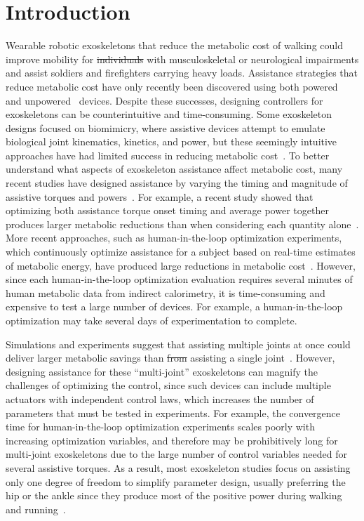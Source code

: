 \documentclass[10pt,letterpaper]{article}
\providecommand{\DIFaddtex}[1]{{\protect\color{blue}\uwave{#1}}} %
\providecommand{\DIFdeltex}[1]{{\protect\color{red}\sout{#1}}}                      %
\providecommand{\DIFaddbegin}{} %
\providecommand{\DIFaddend}{} %
\providecommand{\DIFdelbegin}{} %
\providecommand{\DIFdelend}{} %
\providecommand{\DIFadd}[1]{\texorpdfstring{\DIFaddtex{#1}}{#1}} %
\providecommand{\DIFdel}[1]{\texorpdfstring{\DIFdeltex{#1}}{}} %
\newcommand{\DIFscaledelfig}{0.5}
\newlength{\DIFdelgraphicswidth} %
\newlength{\DIFdelgraphicsheight} %
\newcommand{\DIFaddincludegraphics}[2][]{{\color{blue}\fbox{\DIFOincludegraphics[#1]{#2}}}} %
\newcommand{\DIFdelincludegraphics}[2][]{%
\sbox{\DIFdelgraphicsbox}{\DIFOincludegraphics[#1]{#2}}%
\settoboxwidth{\DIFdelgraphicswidth}{\DIFdelgraphicsbox} %
\settoboxtotalheight{\DIFdelgraphicsheight}{\DIFdelgraphicsbox} %
\scalebox{\DIFscaledelfig}{%
\parbox[b]{\DIFdelgraphicswidth}{\usebox{\DIFdelgraphicsbox}\\[-\baselineskip] \rule{\DIFdelgraphicswidth}{0em}}\llap{\resizebox{\DIFdelgraphicswidth}{\DIFdelgraphicsheight}{%
\setlength{\unitlength}{\DIFdelgraphicswidth}%
\begin{picture}(1,1)%
\thicklines\linethickness{2pt} %
{\color[rgb]{1,0,0}\put(0,0){\framebox(1,1){}}}%
{\color[rgb]{1,0,0}\put(0,0){\line( 1,1){1}}}%
{\color[rgb]{1,0,0}\put(0,1){\line(1,-1){1}}}%
\end{picture}%
}\hspace*{3pt}}} %
} %
\DeclareRobustCommand{\DIFaddbegin}{\DIFOaddbegin \let\includegraphics\DIFaddincludegraphics} %
\DeclareRobustCommand{\DIFaddend}{\DIFOaddend \let\includegraphics\DIFOincludegraphics} %
\DeclareRobustCommand{\DIFdelbegin}{\DIFOdelbegin \let\includegraphics\DIFdelincludegraphics} %
\DeclareRobustCommand{\DIFdelend}{\DIFOaddend \let\includegraphics\DIFOincludegraphics} %
\begin{document}
\section*{Introduction}
Wearable robotic exoskeletons that reduce the metabolic cost of walking could improve mobility for \DIFdelbegin \DIFdel{individuals }\DIFdelend \DIFaddbegin \DIFadd{many individuals including those }\DIFaddend with musculoskeletal or neurological impairments and assist soldiers and firefighters carrying heavy loads. Assistance strategies that reduce metabolic cost have only recently been discovered using both powered~\cite{Sawicki:2008, Malcolm:2013, Mooney:2014, Sawicki:2020} and unpowered~\cite{Collins:2015} devices. Despite these successes, designing controllers for exoskeletons can be counterintuitive and time-consuming. Some exoskeleton designs focused on biomimicry, where assistive devices attempt to emulate biological joint kinematics, kinetics, and power, but these seemingly intuitive approaches have had limited success in reducing metabolic cost~\cite{vanDijk:2011, Cornwall:2015}. To better understand what aspects of exoskeleton assistance affect metabolic cost, many recent studies have designed assistance by varying the timing and magnitude of assistive torques and powers~\cite{Zhang:2017, Ding:2016, Ding:2018, Galle:2017, Quinlivan:2017}. For example, a recent study showed that optimizing both assistance torque onset timing and average power together produces larger metabolic reductions than when considering each quantity alone~\cite{Galle:2017}. More recent approaches, such as human-in-the-loop optimization experiments, which continuously optimize assistance for a subject based on real-time estimates of metabolic energy, have produced large reductions in metabolic cost~\cite{Zhang:2017, Ding:2018}. However, since each human-in-the-loop optimization evaluation requires several minutes of human metabolic data from indirect calorimetry, it is time-consuming and expensive to test a large number of devices. For example, a human-in-the-loop optimization may take several days of experimentation to complete.

Simulations and experiments suggest that assisting multiple joints at once could deliver larger metabolic savings than \DIFdelbegin \DIFdel{from }\DIFdelend assisting a single joint~\cite{Uchida:2016, Quinlivan:2017, Malcolm:2018, Bryan:2020}. However, designing assistance for these ``multi-joint'' exoskeletons can magnify the challenges of optimizing the control, since such devices can include multiple actuators with independent control laws, which increases the number of parameters that must be tested in experiments. For example, the convergence time for human-in-the-loop optimization experiments scales poorly with increasing optimization variables, and therefore may be prohibitively long for multi-joint exoskeletons due to the large number of control variables needed for several assistive torques. As a result, most exoskeleton studies focus on assisting only one degree of freedom to simplify parameter design, usually preferring the hip or the ankle since they produce most of the positive power during walking and running~\cite{Winter:1991, Novacheck:1998, Farris:2012, Sawicki:2020}. 
\end{document}
